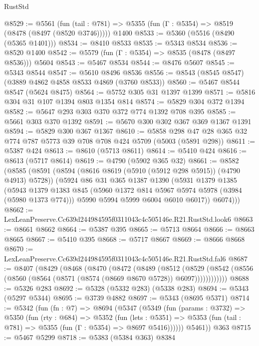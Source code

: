 \begin{lexlean}{RustStd}
\begin{coremodule}
@8529 := @5561
    (fun (tail : @781) => @5355 (fun (Γ : @5354) => @8519 (@8478 (@8497 (@8520 @3746)))))
    @1400
@8533 := @5360 (@5516 (@8490 (@5365 @1401)))
@8534 := @8410 @8533
@8535 := @5343 @8534
@8536 := @8520 @1400
@8542 := @5579 (fun (Γ : @5354) => @8535 (@8478 (@8497 @8536))) @5604
@8543 := @5467 @8534
@8544 := @8476 @5607
@8545 := @5343 @8544
@8547 := @5610 @8496 @8536
@8556 := @8543 (@8545 @8547) (@3889 @4862 @4858 @8533 @4869 (@3760 @8533))
@8560 := @5467 @8544 @8547 (@5624 @8475)
@8564 := @5752 @305 @31 @1397 @1399
@8571 := @5816 @304 @31 @107 @1394 @803 @1354 @814
@8574 := @5829 @304 @372 @1394
@8582 := @5647 @293 @303 @370 @372 @774 @1392 @708 @395
@8585 := @5661 @303 @370 @1392
@8591 := @5670 @300 @302 @367 @369 @1367 @1391
@8594 := @5829 @300 @367 @1367
@8610 := @5858 @298 @47 @28 @365 @32 @774 @787 @5773 @39 @708 @708 @424 @5709 (@5003 (@5891 @298))
@8611 := @5387 @424
@8613 := @8610 (@5713 @8611)
@8614 := @5410 @424
@8616 := @8613 (@5717 @8614)
@8619 := @4790 (@5902 @365 @32)
@8661 := @8582
    (@8585
      (@8591
        (@8594 (@8616 @8619 (@5910 (@5912 @298 @5915)) (@4790 @4913) @5728))
        (@5924
          @86
          @31
          @365
          @1387
          @1390
          (@5931
            @1379
            @1385
            (@5943
              @1379
              @1383
              @845
              (@5960 @1372 @814 @5967 @5974 @5978 (@3984 (@5980 @1373 @774)))
              @5990
              @5994
              @5999
              @6004
              @6010
              @6017))
          @6074)))
@8662 := LexLeanPreserve.Cc639d244984595f0311043c4c505146e.R21.RustStd.look6
@8663 := @8661 @8662
@8664 := @5387 @395
@8665 := @5713 @8664
@8666 := @8663 @8665
@8667 := @5410 @395
@8668 := @5717 @8667
@8669 := @8666 @8668
@8670 := LexLeanPreserve.Cc639d244984595f0311043c4c505146e.R21.RustStd.fal6
@8687 := @8407
    (@8429
      (@8468
        (@8470
          (@8472
            (@8489
              (@8512
                (@8529
                  (@8542 (@8556 (@8560 (@8564 (@8571 (@8574 (@8669 @8670 @5728)) @6097))))))))))))
@8688 := @5326 @283
@8692 := @5328 (@5332 @283) (@5338 @283)
@8694 := @5343 (@5297 @5344)
@8695 := @3739 @4882
@8697 := @5343 (@8695 @5371)
@8714 := @5342
    (fun (fn : @7) =>
    @8694
      (@5347
        (@5349
          (fun (params : @3732) =>
          @5350
            (fun (rty : @684) =>
            @5352
              (fun (lets : @5351) =>
              @5353 (fun (tail : @781) => @5355 (fun (Γ : @5354) => @8697 @5416))))))
        @5461))
    @363
@8715 := @5467 @5299
@8718 := @5383 (@5384 @363) @8384

\end{coremodule}
\end{lexlean}
